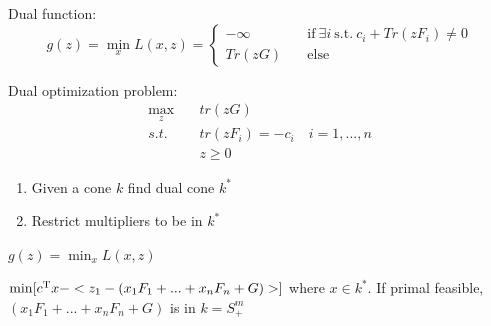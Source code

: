 Dual function:
\begin{equation*}
\label{eq6}
g(z) = \min_x L(x,z)=\left\{
\begin{aligned}
-\infty &\quad\text{if}\ \exists i\ \text{s.t.}\ c_i+Tr(zF_i)\neq 0 \\
Tr(zG) & \quad\text{else}
\end{aligned}
\right.
\end{equation*}

Dual optimization problem:
\begin{align*}
\max_z\quad &tr(zG)\\
s.t.\quad &tr(zF_i)=-c_i\quad i=1,...,n\\
&z\geq 0
\end{align*}

\begin{enumerate}
	\item Given a cone $k$ find dual cone $k^*$
	
	\item Restrict multipliers to be in $k^*$
\end{enumerate}


$g(z)=\min_x L(x,z)$

$\min[c^{{\rm T}}x-<z_1-(x_1F_1+...+x_nF_n+G)>]$ where $x\in k^*$. If primal feasible, $(x_1F_1+...+x_nF_n+G)$ is in $k=S^m_+$





